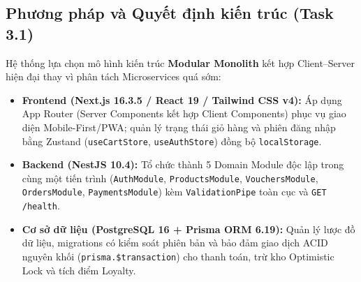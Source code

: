 \documentclass[a4paper,12pt]{article}
\begin{document}
\subsection{Phương pháp và Quyết định kiến trúc (Task 3.1)}
Hệ thống lựa chọn mô hình kiến trúc \textbf{Modular Monolith} kết hợp Client--Server hiện đại thay vì phân tách Microservices quá sớm:
\begin{itemize}
  \item \textbf{Frontend (Next.js 16.3.5 / React 19 / Tailwind CSS v4):} Áp dụng App Router (Server Components kết hợp Client Components) phục vụ giao diện Mobile-First/PWA; quản lý trạng thái giỏ hàng và phiên đăng nhập bằng Zustand (\texttt{useCartStore}, \texttt{useAuthStore}) đồng bộ \texttt{localStorage}.
  \item \textbf{Backend (NestJS 10.4):} Tổ chức thành 5 Domain Module độc lập trong cùng một tiến trình (\texttt{AuthModule}, \texttt{ProductsModule}, \texttt{VouchersModule}, \texttt{OrdersModule}, \texttt{PaymentsModule}) kèm \texttt{ValidationPipe} toàn cục và \texttt{GET /health}.
  \item \textbf{Cơ sở dữ liệu (PostgreSQL 16 + Prisma ORM 6.19):} Quản lý lược đồ dữ liệu, migrations có kiểm soát phiên bản và bảo đảm giao dịch ACID nguyên khối (\texttt{prisma.\$transaction}) cho thanh toán, trừ kho Optimistic Lock và tích điểm Loyalty.
\end{itemize}
\end{document}
